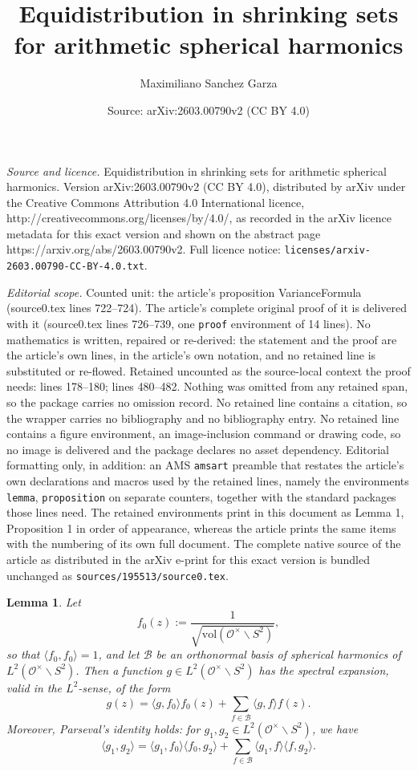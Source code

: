 \documentclass[10pt,a4paper]{amsart}
\title{Equidistribution in shrinking sets for arithmetic spherical harmonics}
\author{Maximiliano Sanchez Garza}
\date{Source: arXiv:2603.00790v2 (CC BY 4.0)}
\newtheorem{lemma}{Lemma}
\begin{document}
\maketitle

\noindent\emph{Source and licence.} Equidistribution in shrinking sets for arithmetic spherical harmonics. Version arXiv:2603.00790v2 (CC BY 4.0), distributed by arXiv under the Creative Commons Attribution 4.0 International licence, http://creativecommons.org/licenses/by/4.0/, as recorded in the arXiv licence metadata for this exact version and shown on the abstract page https://arxiv.org/abs/2603.00790v2. Full licence notice: \texttt{licenses/arxiv-2603.00790-CC-BY-4.0.txt}.\par\smallskip

\noindent\textit{Editorial scope.} Counted unit: the article's proposition VarianceFormula (source0.tex lines 722--724). The article's complete original proof of it is delivered with it (source0.tex lines 726--739, one \texttt{proof} environment of 14 lines). No mathematics is written, repaired or re-derived: the statement and the proof are the article's own lines, in the article's own notation, and no retained line is substituted or re-flowed.  Retained uncounted as the source-local context the proof needs: lines 178--180; lines 480--482.  Nothing was omitted from any retained span, so the package carries no omission record.  No retained line contains a citation, so the wrapper carries no bibliography and no bibliography entry.  No retained line contains a figure environment, an image-inclusion command or drawing code, so no image is delivered and the package declares no asset dependency.  Editorial formatting only, in addition: an AMS \texttt{amsart} preamble that restates the article's own declarations and macros used by the retained lines, namely the environments \texttt{lemma}, \texttt{proposition} on separate counters, together with the standard packages those lines need.  The retained environments print in this document as Lemma 1, Proposition 1 in order of appearance, whereas the article prints the same items with the numbering of its own full document.  The complete native source of the article as distributed in the arXiv e-print for this exact version is bundled unchanged as \texttt{sources/195513/source0.tex}.
\begin{lemma}\label{SpectralRes}
Let $$ f_0(z) := \frac{1}{\sqrt{\mathrm{vol}(\mathcal{O}^{\times} \backslash S^2)}},$$ so that $\langle f_0, f_0 \rangle = 1$, and let $\mathcal{B}$ be an orthonormal basis of spherical harmonics of $L^2(\mathcal{O}^{\times} \backslash S^2)$. Then a function $g \in L^2(\mathcal{O}^{\times} \backslash S^2)$ has the spectral expansion, valid in the $L^2$-sense, of the form $$ g(z) = \langle g, f_0 \rangle f_0(z) + \sum_{f\in \mathcal{B}} \langle g,f\rangle f(z).$$ Moreover, Parseval's identity holds: for $g_1, g_2 \in L^2(\mathcal{O}^{\times} \backslash S^2)$, we have $$ \langle g_1, g_2 \rangle = \langle g_1, f_0\rangle \langle f_0, g_2\rangle + \sum_{f\in \mathcal{B}} \langle g_1, f\rangle \langle f, g_2\rangle.$$
\end{lemma}
\end{document}
